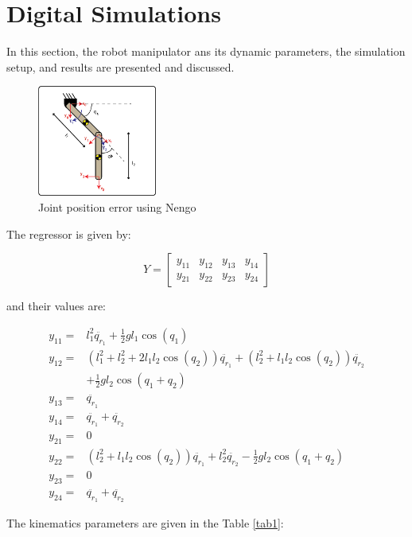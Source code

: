 \section{Digital Simulations}
In this section, the robot manipulator ans its dynamic parameters, the simulation setup, and results are presented and discussed.

\begin{figure}[h]
\centering
\includegraphics[width=0.35\textwidth]{imagenes/6-neuronal/pendubot.png}
 \caption{Joint position error using Nengo}
 \label{fig:error}
\end{figure}

The regressor is given by:

\begin{equation}
Y=\left[\begin{array}{cccc}
y_{11}&y_{12}&y_{13}&y_{14}\\
y_{21}&y_{22}&y_{23}&y_{24}
\end{array}\right]
\end{equation}

and their values are:

\begin{align*}
y_{11}=&l_1^2\ddot{q_{r_1}}+\frac{1}{2}gl_1\cos(q_1)\\
y_{12}=&\left(l_1^2+l_2^2+2l_1l_2\cos(q_2)\right)\ddot{q_{r_1}}+\left(l_2^2+l_1l_2\cos(q_2)\right)\ddot{q_{r_2}}\\
&+\frac{1}{2}gl_2\cos(q_1+q_2)\\
y_{13}=&\ddot{q_{r_1}}\\
y_{14}=&\ddot{q_{r_1}}+\ddot{q_{r_2}}\\
y_{21}=&0\\
y_{22}=&\left(l_2^2+l_1l_2\cos(q_2)\right)\ddot{q_{r_1}}+l_2^2\ddot{q_{r_2}}-\frac{1}{2}gl_2\cos(q_1+q_2)\\
y_{23}=&0\\
y_{24}=&\ddot{q_{r_1}}+\ddot{q_{r_2}}
\end{align*}

The kinematics parameters are given in the Table \ref{tab1}:\\

